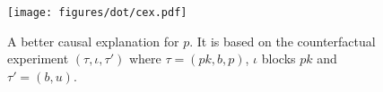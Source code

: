 \begin{figure}
  \vspace*{-0.5cm}
  \begin{center}
    \texttt{[image: figures/dot/cex.pdf]}
  \end{center}
  \vspace{-0.8cm}
  \caption{A better causal explanation for $p$. It is based on the
    counterfactual experiment $(\tau, \iota, \tau')$ where
    $\tau = (pk, b, p)$, $\iota$ blocks $pk$ and $\tau' = (b, u)$.}
  \label{fig:cex}
\end{figure}

